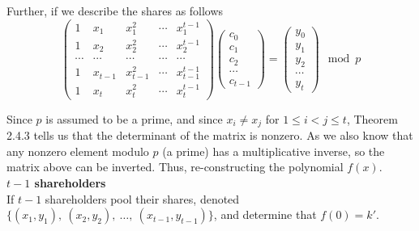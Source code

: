 Further, if we describe the shares as follows
\begin{equation}
  \begin{pmatrix}
    1      & x_1    & x_1^2    & \cdots & x_1^{t-1} \\
    1      & x_2    & x_2^2    & \cdots & x_2^{t-1} \\
    \cdots & \cdots & \cdots  & \cdots & \cdots \\
    1      & x_{t-1} & x_{t-1}^2 & \cdots & x_{t-1}^{t-1} \\
    1      & x_t    & x_t^2    & \cdots & x_t^{t-1}
  \end{pmatrix}
  \begin{pmatrix}
    c_0 \\
    c_1 \\
    c_2 \\
    \cdots \\
    c_{t-1}
  \end{pmatrix} =
  \begin{pmatrix}
    y_0 \\
    y_1 \\
    y_2 \\
    \cdots \\
    y_t
  \end{pmatrix} \mod p
\end{equation}

Since $p$ is assumed to be a prime, and since $x_i \not= x_j$ for $1 \le i
< j \le t$, Theorem 2.4.3 tells us that the determinant of the matrix
is nonzero. As we also know that any nonzero element modulo $p$ (a
prime) has a multiplicative inverse, so the matrix above can be
inverted. Thus, re-constructing the polynomial $f(x)$.
\\

\textbf{$t-1$ shareholders} \\
If $t-1$ shareholders pool their shares, denoted $\{(x_1,y_1),\
(x_2,y_2),\ \ldots,\ (x_{t-1},y_{t-1})\}$, and determine that $f(0) = k'$.

